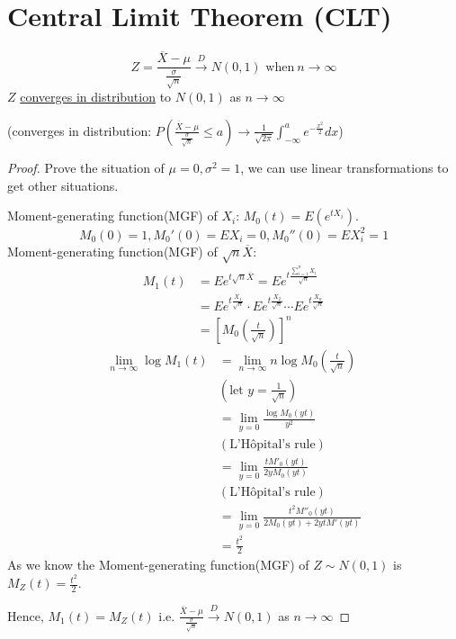 \documentclass[11pt]{elegantbook}
\begin{document}
\section{Central Limit Theorem (CLT)}
\begin{theorem}
    $$Z=\frac{\overline{X}-\mu}{\frac{\sigma}{\sqrt{n}}} \xrightarrow {D} N(0,1) \text{ when}\ n\to \infty$$
    $Z$ \underline{converges in distribution} to $N(0,1)$ as $n\to \infty$

    (converges in distribution: $P(\frac{\overline{X}-\mu}{\frac{\sigma}{\sqrt{n}}}\leq a)\rightarrow \frac{1}{\sqrt{2\pi}}\int_{-\infty}^ae^{-\frac{x^2}{2}}dx$)
\end{theorem}
\begin{proof}
    Prove the situation of $\mu=0,\sigma^2=1$, we can use linear transformations to get other situations.

    Moment-generating function(MGF) of $X_i$: $M_0(t)=E(e^{tX_i})$. $$M_0(0)=1,M_0'(0)=EX_i=0,M_0''(0)=EX_i^2=1$$
    Moment-generating function(MGF) of $\sqrt{n}\overline{X}$:
    \begin{equation}
        \begin{aligned}
            M_1(t)&=Ee^{t\sqrt{n}\overline{X}}=Ee^{t\frac{\sum_{i=1}^nX_i}{\sqrt{n}}}\\
            &=Ee^{t\frac{X_1}{\sqrt{n}}}\cdot Ee^{t\frac{X_2}{\sqrt{n}}}\cdots Ee^{t\frac{X_n}{\sqrt{n}}}\\
            &=[M_0(\frac{t}{\sqrt{n}})]^n
        \end{aligned}
        \nonumber
    \end{equation}
    \begin{equation}
        \begin{aligned}
            \lim_{n \rightarrow	\infty}\log M_1(t)&=\lim_{n \rightarrow	\infty}n\log M_0(\frac{t}{\sqrt{n}})\\
            &(\text{let }y=\frac{1}{\sqrt{n}})\\
            &=\lim_{y=0}\frac{\log M_0(yt)}{y^2}\\
            &(\text{L'Hôpital's rule})\\
            &=\lim_{y=0}\frac{t M'_0(yt)}{2y M_0(yt)}\\
            &(\text{L'Hôpital's rule})\\
            &=\lim_{y=0}\frac{t^2 M''_0(yt)}{2 M_0(yt)+2ytM'(yt)}\\
            &=\frac{t^2}{2}
        \end{aligned}
        \nonumber
    \end{equation}
    As we know the Moment-generating function(MGF) of $Z\sim N(0,1)$ is $M_Z(t)=\frac{t^2}{2}$.

    Hence, $M_1(t)=M_Z(t)$ i.e. $\frac{\overline{X}-\mu}{\frac{\sigma}{\sqrt{n}}} \xrightarrow {D} N(0,1)$ as $n \rightarrow\infty$
\end{proof}
\end{document}

